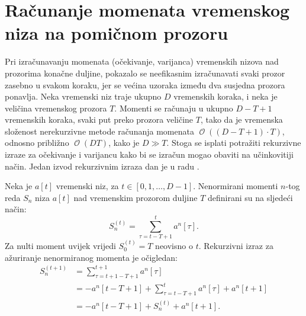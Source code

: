 \documentclass[lmodern, utf8, diplomski, numeric]{fer}
\newcommand{\bigO}[1]{\operatorname{\mathcal{O}}\q(#1\w)}
\newcommand{\q}{\left}
\newcommand{\w}{\right}
\begin{document}
  \chapter{Računanje momenata vremenskog niza na pomičnom prozoru}
  \label{appendix}
  Pri izračunavanju momenata (očekivanje, varijanca) vremenskih nizova nad prozorima konačne duljine, pokazalo se neefikasnim izračunavati svaki prozor zasebno u svakom koraku, jer se većina uzoraka između dva susjedna prozora ponavlja.
  Neka vremenski niz traje ukupno $D$ vremenskih koraka, i neka je veličina vremenskog prozora $T$.
  Momenti se računaju u ukupno $D - T + 1$ vremenskih koraka, svaki put preko prozora veličine $T$, tako da je vremenska složenost nerekurzivne metode računanja momenata $\bigO{\q(D - T + 1\w)\cdot T}$, odnosno približno $\bigO{DT}$, kako je $D \gg T$.
  Stoga se isplati potražiti rekurzivne izraze za očekivanje i varijancu kako bi se izračun mogao obaviti na učinkovitiji način.
  Jedan izvod rekurzivnim izraza dan je u radu \citep{stats}.
  
  Neka je $a\q[t\w]$ vremenski niz, za $t \in \q[0, 1, \ldots, D - 1\w]$.
  Nenormirani momenti $n$-tog reda $S_n$ niza $a\q[t\w]$ nad vremenskim prozorom duljine $T$ definirani su na sljedeći način:
  \begin{equation}
  \label{eq:nonnorm}
  S_n^{(t)} = \sum_{\tau=t-T+1}^{t} a^n\q[\tau\w].
  \end{equation}
  Za nulti moment uvijek vrijedi $S_0^{(t)} = T$ neovisno o $t$.
  Rekurzivni izraz za ažuriranje nenormiranog momenta je očigledan:
  \begin{align}
  S_n^{(t+1)} &= \sum_{\tau=t+1-T+1}^{t+1} a^n\q[\tau\w] \nonumber \\
    &= -a^n\q[t-T+1\w] + \sum_{\tau=t-T+1}^{t} a^n\q[\tau\w] + a^n\q[t+1\w] \nonumber \\
    \label{eq:rec}
    &= -a^n\q[t-T+1\w] + S_n^{(t)} + a^n\q[t+1\w].
  \end{align}
  
\end{document}
